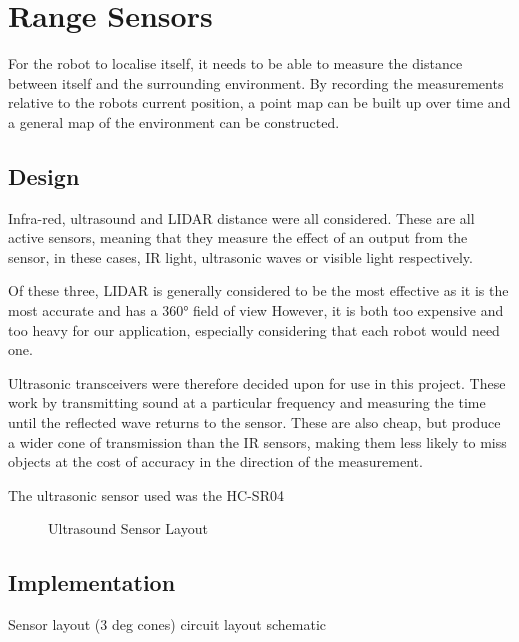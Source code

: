 \section{Range Sensors}\label{elec/range}
For the robot to localise itself, it needs to be able to measure the
distance between itself and the surrounding environment. By recording
the measurements relative to the robots current position, a point map
can be built up over time and a general map of the environment can be
constructed.

\subsection{Design}\label{elec/range/design}
Infra-red, ultrasound and LIDAR distance were all considered. These
are all active sensors, meaning that they measure the effect of an
output from the sensor, in these cases, IR light, ultrasonic waves
or visible light respectively.

Of these three, LIDAR is generally considered to be the most effective
as it is the most accurate and has a \ang{360} field of view However,
it is both too expensive and too heavy for our application, especially
considering that each robot would need one.


Ultrasonic transceivers were therefore decided upon for use in this
project. These work by transmitting sound at a particular frequency
and measuring the time until the reflected wave returns to the sensor.
These are also cheap, but produce a wider cone of transmission than
the IR sensors, making them less likely to miss objects at the cost
of accuracy in the direction of the measurement.

The ultrasonic sensor used was the HC-SR04



\begin{figure}[!ht]
	\centering
	\caption{Ultrasound Sensor Layout}\label{UltraSoundSensorDiagram}

\end{figure}

\subsection{Implementation}\label{elec/range/impl}
Sensor layout (3 deg cones)
circuit layout
schematic


